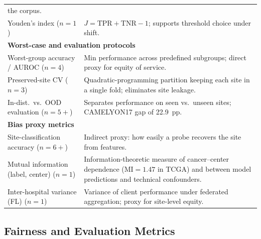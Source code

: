 \begin{table}[htbp]
\begin{tabularx}{\linewidth}{@{}p{7.6cm} X@{}}
      the corpus. \\
    Youden's index ($n=1$) \citep{roschewitz2023automatic} &
      $J = \text{TPR} + \text{TNR} - 1$; supports threshold choice
      under shift. \\
    \midrule
    \multicolumn{2}{l}{\textbf{Worst-case and evaluation protocols}} \\
    Worst-group accuracy / AUROC ($n=4$) \citep{soltan2024challenges,huang2025knowledge,lin2025contrastive,xu2026spare} &
      Min performance across predefined subgroups; direct proxy for
      equity of service. \\
    Preserved-site CV ($n=3$) \citep{howard2021site,vaidya2024demographic,kheiri2025investigation} &
      Quadratic-programming partition keeping each site in a single
      fold; eliminates site leakage. \\
    In-dist.\ vs.\ OOD evaluation ($n=5+$) \citep{huang2025knowledge,asadiaghbolagh2024learning,komen2024batch,faryna2024automatic,ktena2024generative} &
      Separates performance on seen vs.\ unseen sites;
      CAMELYON17 gap of 22.9~pp. \\
    \midrule
    \multicolumn{2}{l}{\textbf{Bias proxy metrics}} \\
    Site-classification accuracy ($n=6+$) \citep{dehkharghanian2023biased,bidgoli2022bias,mazaheri2023ranking,howard2021site,komen2024batch,kheiri2025investigation} &
      Indirect proxy: how easily a probe recovers the site from
      features. \\
    Mutual information (label, center) ($n=1$) \citep{kheiri2025investigation,lazard2022identifies} &
      Information-theoretic measure of cancer--center dependence
      ($\text{MI}=1.47$ in TCGA) and between model predictions and
      technical confounders. \\
    Inter-hospital variance (FL) ($n=1$) \citep{hosseini2023proportionally} &
      Variance of client performance under federated aggregation;
      proxy for site-level equity. \\
    \bottomrule
  \end{tabularx}
\end{table}

\subsection{Fairness and Evaluation Metrics}
\label{sec:results:metrics}

